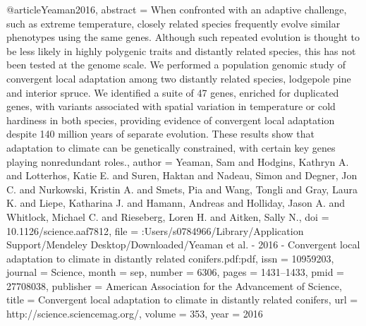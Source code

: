 @article{Yeaman2016,
abstract = {When confronted with an adaptive challenge, such as extreme temperature, closely related species frequently evolve similar phenotypes using the same genes. Although such repeated evolution is thought to be less likely in highly polygenic traits and distantly related species, this has not been tested at the genome scale. We performed a population genomic study of convergent local adaptation among two distantly related species, lodgepole pine and interior spruce. We identified a suite of 47 genes, enriched for duplicated genes, with variants associated with spatial variation in temperature or cold hardiness in both species, providing evidence of convergent local adaptation despite 140 million years of separate evolution. These results show that adaptation to climate can be genetically constrained, with certain key genes playing nonredundant roles.},
author = {Yeaman, Sam and Hodgins, Kathryn A. and Lotterhos, Katie E. and Suren, Haktan and Nadeau, Simon and Degner, Jon C. and Nurkowski, Kristin A. and Smets, Pia and Wang, Tongli and Gray, Laura K. and Liepe, Katharina J. and Hamann, Andreas and Holliday, Jason A. and Whitlock, Michael C. and Rieseberg, Loren H. and Aitken, Sally N.},
doi = {10.1126/science.aaf7812},
file = {:Users/s0784966/Library/Application Support/Mendeley Desktop/Downloaded/Yeaman et al. - 2016 - Convergent local adaptation to climate in distantly related conifers.pdf:pdf},
issn = {10959203},
journal = {Science},
month = {sep},
number = {6306},
pages = {1431--1433},
pmid = {27708038},
publisher = {American Association for the Advancement of Science},
title = {{Convergent local adaptation to climate in distantly related conifers}},
url = {http://science.sciencemag.org/},
volume = {353},
year = {2016}
}
